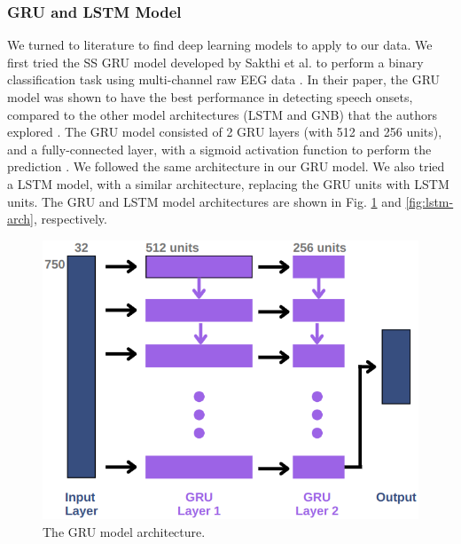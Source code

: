 \documentclass[format=sigconf, nonacm=true, review=false, screen=true]{acmart}
\begin{document}
\subsubsection{GRU and LSTM Model}
We turned to literature to find deep learning models to apply to our data. We first tried the SS GRU model developed by Sakthi et al. to perform a binary classification task using multi-channel raw EEG data \cite{sakthi2021keyword}. In their paper, the GRU model was shown to have the best performance in detecting speech onsets, compared to the other model architectures (LSTM and GNB) that the authors explored \cite{sakthi2021keyword}. The GRU model consisted of 2 GRU layers (with 512 and 256 units), and a fully-connected layer, with a sigmoid activation function to perform the prediction \cite{sakthi2021keyword}. We followed the same architecture in our GRU model. We also tried a LSTM model, with a similar architecture, replacing the GRU units with LSTM units. The GRU and LSTM model architectures are shown in Fig. \ref{fig:gru-arch} and \ref{fig:lstm-arch}, respectively.

\begin{figure}[H]
    \centering
    \includegraphics[width=\columnwidth]{figures/gru-arch.png}
    \caption{The GRU model architecture.}
    \label{fig:gru-arch}
\end{figure}
\end{document}
